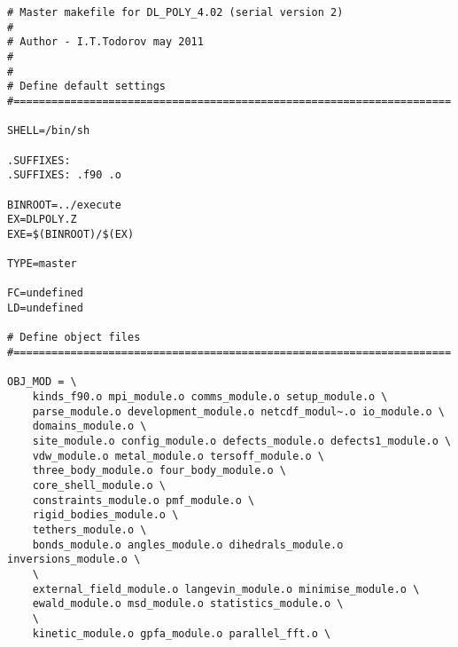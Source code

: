 \begin{verbatim}
# Master makefile for DL_POLY_4.02 (serial version 2)
#
# Author - I.T.Todorov may 2011
#
#
# Define default settings
#=====================================================================

SHELL=/bin/sh

.SUFFIXES:
.SUFFIXES: .f90 .o

BINROOT=../execute
EX=DLPOLY.Z
EXE=$(BINROOT)/$(EX)

TYPE=master

FC=undefined
LD=undefined

# Define object files
#=====================================================================

OBJ_MOD = \
	kinds_f90.o mpi_module.o comms_module.o setup_module.o \
	parse_module.o development_module.o netcdf_modul~.o io_module.o \
	domains_module.o \
	site_module.o config_module.o defects_module.o defects1_module.o \
	vdw_module.o metal_module.o tersoff_module.o \
	three_body_module.o four_body_module.o \
	core_shell_module.o \
	constraints_module.o pmf_module.o \
	rigid_bodies_module.o \
	tethers_module.o \
	bonds_module.o angles_module.o dihedrals_module.o inversions_module.o \
	\
	external_field_module.o langevin_module.o minimise_module.o \
	ewald_module.o msd_module.o statistics_module.o \
	\
	kinetic_module.o gpfa_module.o parallel_fft.o \


\end{verbatim}

